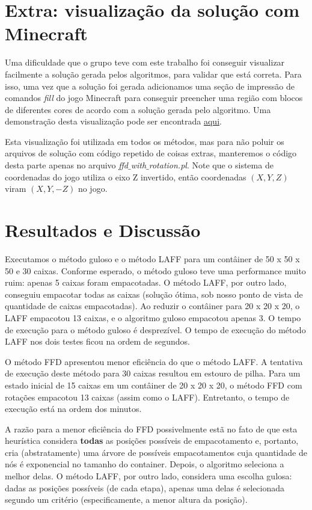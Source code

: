 \documentclass[12pt]{article}
\begin{document}
\section{Extra: visualização da solução com Minecraft}

Uma dificuldade que o grupo teve com este trabalho foi conseguir visualizar facilmente a solução gerada pelos algoritmos, para validar que está correta. Para isso, uma vez que a solução foi gerada adicionamos uma seção de impressão de comandos \textit{fill} do jogo Minecraft para conseguir preencher uma região com blocos de diferentes cores de acordo com a solução gerada pelo algoritmo. Uma demonstração desta visualização pode ser encontrada \href{https://www.youtube.com/watch?v=qInZZb9y1dQ}{aqui}.

Esta visualização foi utilizada em todos os métodos, mas para não poluir os arquivos de solução com código repetido de coisas extras, manteremos o código desta parte apenas no arquivo \textit{ffd$\_$with$\_$rotation.pl}. Note que o sistema de coordenadas do jogo utiliza o eixo Z invertido, então coordenadas $(X, Y, Z)$ viram $(X, Y, -Z)$ no jogo.

\section{Resultados e Discussão}

Executamos o método guloso e o método LAFF para um contâiner de 50 x 50 x 50 e 30 caixas. Conforme esperado, o método guloso teve uma performance muito ruim: apenas 5 caixas foram empacotadas. O método LAFF, por outro lado, conseguiu empacotar todas as caixas (solução ótima, sob nosso ponto de vista de quantidade de caixas empacotadas). Ao reduzir o contâiner para 20 x 20 x 20, o LAFF empacotou 13 caixas, e o algoritmo guloso empacotou apenas 3. O tempo de execução para o método guloso é desprezível. O tempo de execução do método LAFF nos dois testes ficou na ordem de segundos.

O método FFD apresentou menor eficiência do que o método LAFF. A tentativa de execução deste método para 30 caixas resultou em estouro de pilha. Para um estado inicial de 15 caixas em um contâiner de 20 x 20 x 20, o método FFD com rotações empacotou 13 caixas (assim como o LAFF). Entretanto, o tempo de execução está na ordem dos minutos.

A razão para a menor eficiência do FFD possivelmente estã no fato de que esta heurística considera \textbf{todas} as posições possíveis de empacotamento e, portanto, cria (abstratamente) uma árvore de possíveis empacotamentos cuja quantidade de nós é exponencial no tamanho do container. Depois, o algoritmo seleciona a melhor delas. O método LAFF, por outro lado, considera uma escolha gulosa: dadas as posições possíveis (de cada etapa), apenas uma delas é selecionada segundo um critério (especificamente, a menor altura da posição).
\end{document}
